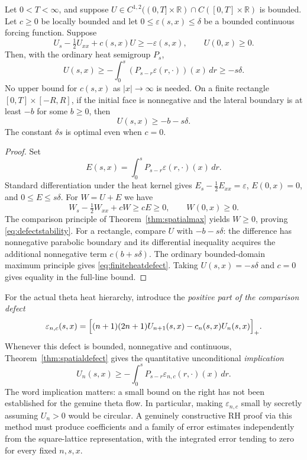 \begin{theorem}
\label{thm:spatialdefect}
Let $0<T<\infty$, and suppose
$U\in C^{1,2}((0,T]\times\mathbb R)
\cap C([0,T]\times\mathbb R)$ is bounded.
Let $c\ge0$ be locally bounded and let
$0\le\varepsilon(s,x)\le\delta$ be a bounded
continuous forcing function. Suppose
\[
U_s-\tfrac12U_{xx}+c(s,x)U\ge-\varepsilon(s,x),
\qquad U(0,x)\ge0.
\]
Then, with the ordinary heat semigroup $P_s$,
\begin{equation}\label{eq:defectstability}
\boxed{
U(s,x)\ge
-\int_0^s(P_{s-r}\varepsilon(r,\cdot))(x)\,dr
\ge-s\delta.}
\end{equation}
No upper bound for $c(s,x)$ as $|x|\to\infty$
is needed. On a finite rectangle
$[0,T]\times[-R,R]$, if the initial face
is nonnegative and the lateral boundary is
at least $-b$ for some $b\ge0$,
then
\begin{equation}\label{eq:finiteheatdefect}
U(s,x)\ge-b-s\delta .
\end{equation}
The constant $\delta s$ is optimal even
when $c=0$.
\end{theorem}
\begin{proof}
Set
\[
E(s,x)=\int_0^s P_{s-r}\varepsilon(r,\cdot)(x)\,dr .
\]
Standard differentiation under the heat kernel
gives $E_s-\tfrac12E_{xx}=\varepsilon$,
$E(0,x)=0$, and $0\le E\le s\delta$.
For $W=U+E$ we have
\[
W_s-\tfrac12W_{xx}+cW
\ge cE\ge0,\qquad W(0,x)\ge0 .
\]
The comparison principle of
Theorem~\ref{thm:spatialmax} yields $W\ge0$,
proving \eqref{eq:defectstability}.
For a rectangle, compare $U$ with
$-b-s\delta$: the difference has
nonnegative parabolic boundary and its
differential inequality acquires the
additional nonnegative term
$c(b+s\delta)$. The ordinary bounded-domain
maximum principle gives
\eqref{eq:finiteheatdefect}. Taking
$U(s,x)=-s\delta$ and $c=0$
gives equality in the full-line bound.
\end{proof}

For the actual theta heat hierarchy,
introduce the \emph{positive part of the
comparison defect}
\begin{equation}\label{eq:actualdefect}
\varepsilon_{n,c}(s,x)=
\Bigl[
(n+1)(2n+1)U_{n+1}(s,x)
-c_n(s,x)U_n(s,x)
\Bigr]_+ .
\end{equation}
Whenever this defect is bounded, nonnegative
and continuous, Theorem~\ref{thm:spatialdefect}
gives the quantitative unconditional
\emph{implication}
\begin{equation}\label{eq:actualdefectbound}
U_n(s,x)\ge
-\int_0^s
P_{s-r}\varepsilon_{n,c}(r,\cdot)(x)\,dr .
\end{equation}
The word implication matters: a small
bound on the right has not been
established for the genuine theta flow.
In particular, making
$\varepsilon_{n,c}$ small by secretly
assuming $U_n>0$ would be circular.
A genuinely constructive RH proof via
this method must produce coefficients and
a family of error estimates independently
from the square-lattice representation,
with the integrated error tending to zero
for every fixed $n,s,x$.

